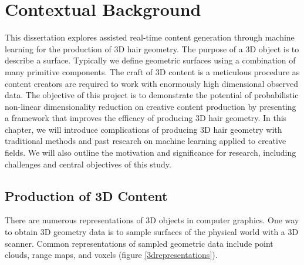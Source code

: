 \documentclass[ %
author={Dillon Keith Diep},
supervisor={Dr. Carl Henrik Ek},
degree={MEng},
title={ART-CG Hair:},
subtitle={Assisted Real-time Content Generation of Stylised Virtual Hair},
type={Research},
year={2017} ]{dissertation}
\begin{document}
%

\mainmatter


\chapter{Contextual Background}
\label{chap:context}
This dissertation explores assisted real-time content generation through machine learning for the production of 3D hair geometry.
The purpose of a 3D object is to describe a surface. Typically we define geometric surfaces using a combination of many primitive components. The craft of 3D content is a meticulous procedure as content creators are required to work with enormously high dimensional observed data.
The objective of this project is to demonstrate the potential of probabilistic non-linear dimensionality reduction on creative content production by presenting a framework that improves the efficacy of producing 3D hair geometry. 
In this chapter, we will introduce complications of producing 3D hair geometry with traditional methods and past research on machine learning applied to creative fields. We will also outline the motivation and significance for research, including challenges and central objectives of this study.

\section{Production of 3D Content}
There are numerous representations of 3D objects in computer graphics. One way to obtain 3D geometry data is to sample surfaces of the physical world with a 3D scanner. Common representations of sampled geometric data include point clouds, range maps, and voxels (figure \ref{3drepresentations}).
\end{document}

